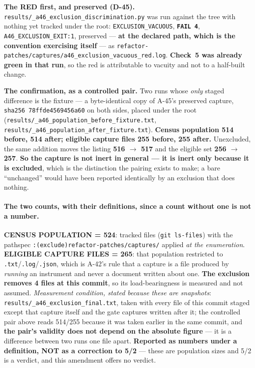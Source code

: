\documentclass[
  10pt,
]{article}
\begin{document}
\textbf{The RED first, and preserved (D-45).} \texttt{results/\allowbreak{}\_a46\_exclusion\_discrimination.py} was run against the tree with nothing yet tracked under the root: \texttt{EXCLUSION\_VACUOUS}, \textbf{\texttt{FAIL 4}}, \texttt{A46\_EXCLUSION\_EXIT:1}, preserved --- \textbf{at the declared path, which is the convention exercising itself} --- as \texttt{refactor-patches/\allowbreak{}captures/\allowbreak{}a46\_exclusion\_vacuous\_red.log}. \textbf{Check~5 was already green in that run}, so the red is attributable to vacuity and not to a half-built change.

\textbf{The confirmation, as a controlled pair.} Two runs whose \emph{only} staged difference is the fixture --- a byte-identical copy of A-45's preserved capture, \texttt{sha256 78ffde4569456a60} on both sides, placed under the root (\texttt{results/\allowbreak{}\_a46\_population\_before\_fixture.txt}, \texttt{results/\allowbreak{}\_a46\_population\_after\_fixture.txt}). \textbf{Census population 514 before, 514 after; eligible capture files 255 before, 255 after.} Unexcluded, the same addition moves the listing \textbf{516 $\rightarrow$ 517} and the eligible set \textbf{256 $\rightarrow$ 257}. \textbf{So the capture is not inert in general --- it is inert only because it is excluded}, which is the distinction the pairing exists to make; a bare ``unchanged'' would have been reported identically by an exclusion that does nothing.

\paragraph{The two counts, with their definitions, since a count without one is not a number.}
\textbf{CENSUS POPULATION = 524}: tracked files (\texttt{git ls-files}) with the pathspec \texttt{:(exclude)refactor-patches/captures/} applied \emph{at the enumeration}. \textbf{ELIGIBLE CAPTURE FILES = 265}: that population restricted to \texttt{.txt}/\texttt{.log}/\texttt{.json}, which is A-42's rule that a capture is a file produced by \emph{running} an instrument and never a document written about one. \textbf{The exclusion removes 4 files at this commit}, so its load-bearingness is measured and not assumed. \emph{Measurement condition, stated because these are snapshots}: \texttt{results/\allowbreak{}\_a46\_exclusion\_final.txt}, taken with every file of this commit staged except that capture itself and the gate captures written after it; the controlled pair above reads 514/255 because it was taken earlier in the same commit, and \textbf{the pair's validity does not depend on the absolute figure} --- it is a difference between two runs one file apart. \textbf{Reported as numbers under a definition, NOT as a correction to 5/2} --- these are population sizes and 5/2 is a verdict, and this amendment offers no verdict.
\end{document}
